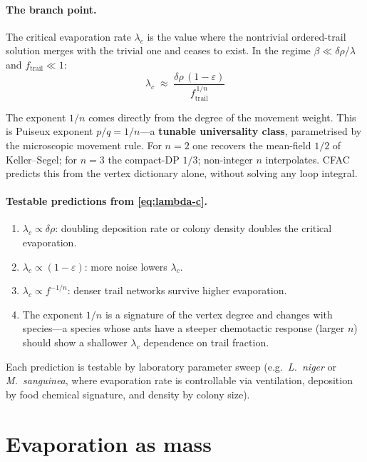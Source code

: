 \documentclass[10pt,a4paper,twocolumn]{article}
\theoremstyle{definition}
\begin{document}
\paragraph{The branch point.}
The critical evaporation rate $\lambda_c$ is the value where the
nontrivial ordered-trail solution merges with the trivial one
and ceases to exist.  In the regime
$\beta \ll \delta\rho/\lambda$ and $f_{\text{trail}} \ll 1$:
\begin{equation}\label{eq:lambda-c}
  \boxed{\;
  \lambda_c \;\approx\;
    \frac{\delta\rho\,(1{-}\varepsilon)}
         {f_{\text{trail}}^{\,1/n}}\;}
\end{equation}

The exponent $1/n$ comes directly from the degree of the
movement weight.  This is Puiseux exponent
$p/q = 1/n$---a \textbf{tunable universality class},
parametrised by the microscopic movement rule.  For $n=2$ one
recovers the mean-field $1/2$ of Keller--Segel; for $n=3$ the
compact-DP $1/3$; non-integer $n$ interpolates.  CFAC predicts
this from the vertex dictionary alone, without solving any loop
integral.

\paragraph{Testable predictions from \eqref{eq:lambda-c}.}
\begin{enumerate}
  \item $\lambda_c \propto \delta\rho$: doubling deposition rate
    or colony density doubles the critical evaporation.
  \item $\lambda_c \propto (1-\varepsilon)$: more noise lowers
    $\lambda_c$.
  \item $\lambda_c \propto f^{-1/n}$: denser trail networks
    survive higher evaporation.
  \item The exponent $1/n$ is a signature of the vertex degree
    and changes with species---a species whose ants have a
    steeper chemotactic response (larger $n$) should show a
    shallower $\lambda_c$ dependence on trail fraction.
\end{enumerate}

Each prediction is testable by laboratory parameter sweep
(e.g.\ \textit{L.\ niger} or \textit{M.\ sanguinea}, where
evaporation rate is controllable via ventilation, deposition by
food chemical signature, and density by colony size).

\section{Evaporation as mass}\label{sec:evap-mass}
\end{document}
